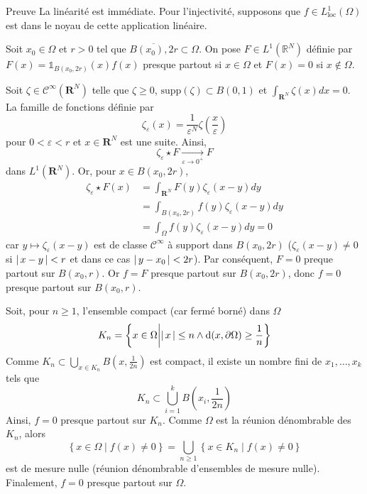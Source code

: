         \begin{demo}{Preuve}
            La linéarité est immédiate. Pour l’injectivité, supposons que $f \in L^1_{\text{loc}}(\Omega)$ est dans le noyau de cette application linéaire.

            Soit $x_0 \in \Omega$ et $r > 0$ tel que $\overline{B(x_0), 2r} \subset \Omega$. On pose $F \in L^1(\mathbb{R}^N)$ définie par $F(x) = \mathbb{1}_{B(x_0,2r)}(x)f(x)$ presque partout si $x \in \Omega$ et $F(x) = 0$ si $x \notin \Omega$. 
            
            Soit $\zeta \in \mathcal{C}^{\infty}(\mathbf{R}^N)$ telle que $\zeta \geq 0$, $\text{supp}(\zeta) \subset B(0,1)$ et $\int_{\mathbf{R}^N} \zeta(x)dx = 0$. La famille de fonctions définie par 
            \[ \zeta_{\varepsilon}(x) = \frac{1}{\varepsilon^N} \zeta\left(\frac{x}{\varepsilon}\right) \] 
            pour $0 < \varepsilon < r$ et $x \in \mathbf{R}^N$ est une suite. Ainsi, 
            \[ \zeta_{\varepsilon} \star F \underset{\varepsilon \to 0^+}{\longrightarrow} F \]   
            dans $L^1(\mathbf{R}^N)$. Or, pour $x \in B(x_0,2r)$, 
            \begin{align*}
                \zeta_{\varepsilon} \star F(x) 
                &= \int_{\mathbf{R}^N} F(y) \zeta_{\varepsilon}(x-y)dy \\
                &= \int_{B(x_0, 2r)} f(y) \zeta_{\varepsilon}(x-y)dy \\
                &= \int_{\Omega} f(y) \zeta_{\varepsilon}(x-y)dy = 0
            \end{align*}
            car $y \mapsto \zeta_{\varepsilon}(x - y)$ est de classe $\mathcal{C}^{\infty}$ à support dans $B(x_0, 2r)$ ($\zeta_{\varepsilon}(x - y) \neq 0$ si $\left\lvert \, x-y \, \right\rvert < r$ et dans ce cas $\left\lvert \, y - x_0 \, \right\rvert < 2r$). Par conséquent, $F = 0$ preque partout sur $B(x_0, r)$. Or $f = F$ presque partout sur $B(x_0, 2r)$, donc $f = 0$ presque partout sur $B(x_0,r)$.

            Soit, pour $n \geq 1$, l’ensemble compact (car fermé borné) dans $\Omega$ 
            \[ K_n = \left\{x \in \Omega \middle| \left\lvert \, x \, \right\rvert \leq n \land \text{d}(x, \partial \Omega) \geq \frac{1}{n} \right\} \]   
            Comme $K_n \subset \bigcup_{x \in K_n} B\left(x,\frac{1}{2n}\right)$ est compact, il existe un nombre fini de $x_1, \ldots, x_k$ tels que 
            \[ K_n \subset \bigcup_{i = 1}^k B(x_i, \frac{1}{2n}) \]   
            Ainsi, $f = 0$ presque partout sur $K_n$. Comme $\Omega$ est la réunion dénombrable des $K_n$, alors 
            \[ \left\{x \in \Omega \middle| f(x) \neq 0\right\} = \bigcup_{n \geq 1} \left\{x \in K_n \middle| f(x) \neq 0\right\} \]   
            est de mesure nulle (réunion dénombrable d’ensembles de mesure nulle). Finalement, $f = 0$ presque partout sur $\Omega$.
        \end{demo}

